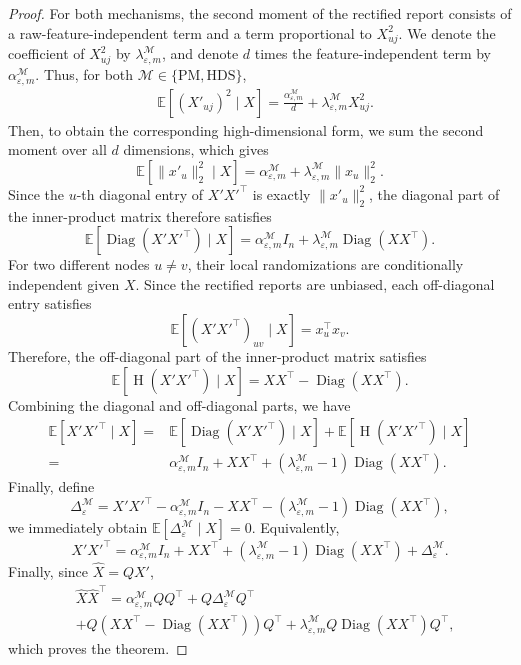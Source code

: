 \documentclass[conference,compsoc]{IEEEtran}
\theoremstyle{boldplain}
\theoremstyle{bolddefinition}
\theoremstyle{remark}
\begin{document}
{\begin{proof}
For both mechanisms, the second moment of the rectified report consists of a raw-feature-independent term and a term proportional to $X_{uj}^2$. 
We denote the coefficient of $X_{uj}^2$ by
$\lambda_{\varepsilon,m}^{\mathcal{M}}$, and denote $d$ times the feature-independent term by
$\alpha_{\varepsilon,m}^{\mathcal{M}}$.
Thus, for both $\mathcal{M}\in\{\mathrm{PM},\mathrm{HDS}\}$,
$$
\begin{aligned}
&\mathbb{E}[(X'_{uj})^2\mid X]
=
\frac{\alpha_{\varepsilon,m}^{\mathcal{M}}}{d}
+
\lambda_{\varepsilon,m}^{\mathcal{M}}X_{uj}^2.
\end{aligned}
$$
Then, to obtain the corresponding high-dimensional form, we sum the second moment over all $d$ dimensions, which gives
$$
\mathbb{E}[\|x'_u\|_2^2\mid X]
=
\alpha_{\varepsilon,m}^{\mathcal{M}}
+
\lambda_{\varepsilon,m}^{\mathcal{M}}\|x_u\|_2^2.
$$
Since the $u$-th diagonal entry of $X'X'^\top$ is exactly $\|x'_u\|_2^2$, the diagonal part of the inner-product matrix therefore satisfies
$$
\mathbb{E}[\operatorname{Diag}(X'X'^\top)\mid X]
=
\alpha_{\varepsilon,m}^{\mathcal{M}}I_n
+
\lambda_{\varepsilon,m}^{\mathcal{M}}
\operatorname{Diag}(XX^\top).
$$
For two different nodes $u\neq v$, their local randomizations are conditionally independent given $X$. Since the rectified reports are unbiased, each off-diagonal entry satisfies
$$
\mathbb{E}[(X'X'^\top)_{uv}\mid X]
=
x_u^\top x_v.
$$
Therefore, the off-diagonal part of the inner-product matrix satisfies
$$
\mathbb{E}[\operatorname{H}(X'X'^\top)\mid X]
=
XX^\top-\operatorname{Diag}(XX^\top).
$$
Combining the diagonal and off-diagonal parts, we have
$$
\begin{aligned}
\mathbb{E}[X'X'^\top\mid X]
={}&
\mathbb{E}[\operatorname{Diag}(X'X'^\top)\mid X]
+
\mathbb{E}[\operatorname{H}(X'X'^\top)\mid X]
\\
={}&
\alpha_{\varepsilon,m}^{\mathcal{M}}I_n
+
XX^\top
+
(\lambda_{\varepsilon,m}^{\mathcal{M}}-1)
\operatorname{Diag}(XX^\top).
\end{aligned}
$$
Finally, define
$$
\Delta_{\varepsilon}^{\mathcal{M}}
=
X'X'^\top
-
\alpha_{\varepsilon,m}^{\mathcal{M}}I_n
-
XX^\top
-
(\lambda_{\varepsilon,m}^{\mathcal{M}}-1)
\operatorname{Diag}(XX^\top),
$$
we immediately obtain
$\mathbb{E}[\Delta_{\varepsilon}^{\mathcal{M}}\mid X]=0$.
Equivalently,
$$
X'X'^\top
=
\alpha_{\varepsilon,m}^{\mathcal{M}}I_n
+
XX^\top
+
(\lambda_{\varepsilon,m}^{\mathcal{M}}-1)
\operatorname{Diag}(XX^\top)
+
\Delta_{\varepsilon}^{\mathcal{M}}.
$$
Finally, since $\widehat X=QX'$,
$$
\begin{aligned}
&\widehat X\widehat X^\top
=
\alpha_{\varepsilon,m}^{\mathcal{M}}QQ^\top
+
Q\Delta_{\varepsilon}^{\mathcal{M}}Q^\top \\
&+
Q\left(XX^\top-\operatorname{Diag}(XX^\top)\right)Q^\top
+
\lambda_{\varepsilon,m}^{\mathcal{M}}
Q\operatorname{Diag}(XX^\top)Q^\top,
\end{aligned}
$$
which proves the theorem.
\end{proof}














}
\end{document}
